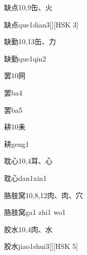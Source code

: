 \begin{entry}{缺点}{10,9}{⽸、⽕}
  \begin{phonetics}{缺点}{que1dian3}[][HSK 3]
  \end{phonetics}
\end{entry}

\begin{entry}{缺勤}{10,13}{⽸、⼒}
  \begin{phonetics}{缺勤}{que1qin2}
  \end{phonetics}
\end{entry}

\begin{entry}{罢}{10}{⽹}
  \begin{phonetics}{罢}{ba4}
  \end{phonetics}
  \begin{phonetics}{罢}{ba5}
  \end{phonetics}
\end{entry}

\begin{entry}{耕}{10}{⽾}
  \begin{phonetics}{耕}{geng1}
  \end{phonetics}
\end{entry}

\begin{entry}{耽心}{10,4}{⽿、⼼}
  \begin{phonetics}{耽心}{dan1xin1}
  \end{phonetics}
\end{entry}

\begin{entry}{胳肢窝}{10,8,12}{⾁、⾁、⽳}
  \begin{phonetics}{胳肢窝}{ga1 zhi1 wo1}
  \end{phonetics}
\end{entry}

\begin{entry}{胶水}{10,4}{⾁、⽔}
  \begin{phonetics}{胶水}{jiao1shui3}[][HSK 5]
  \end{phonetics}
\end{entry}

